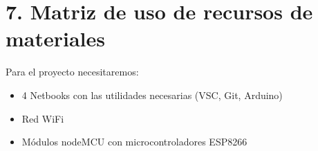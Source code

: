 \section{7. Matriz de uso de recursos de materiales}
\label{sec:recursos}

Para el proyecto necesitaremos:

\begin{itemize}
  \item 4 Netbooks con las utilidades necesarias (VSC, Git, Arduino)
  \item Red WiFi
  \item Módulos nodeMCU con microcontroladores ESP8266
\end{itemize}
